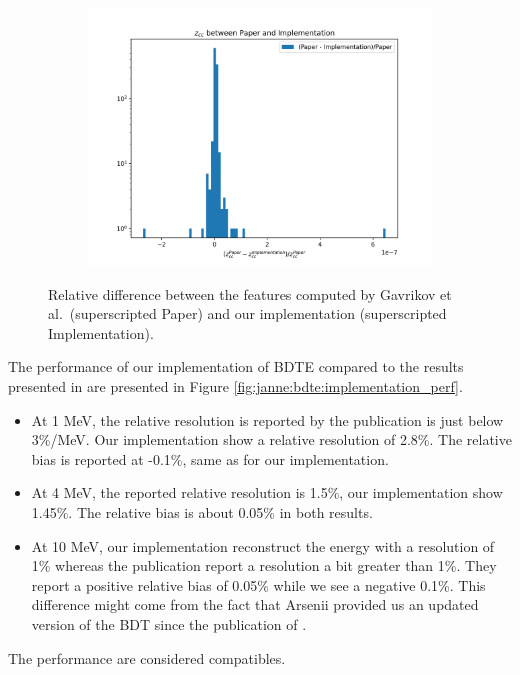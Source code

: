 \documentclass[../main.tex]{subfiles}
\begin{document}
\begin{figure}[ht]
\begin{subfigure}[t]{0.32\linewidth}
    \includegraphics[width=\linewidth]{images/janne/bdte/z_cc_diff.png}
  \end{subfigure}
  \caption{Relative difference between the features computed by Gavrikov et al.\ (superscripted Paper) and our implementation (superscripted Implementation).}
  \label{fig:janne:feat_diff}
\end{figure}

The performance of our implementation of BDTE compared to the results presented in \cite{gavrikov_energy_2022} are presented in Figure \ref{fig:janne:bdte:implementation_perf}.
\begin{itemize}
  \item At 1 MeV, the relative resolution is reported by the publication is just below 3\%/MeV. Our implementation show a relative resolution of 2.8\%. The relative bias is reported at -0.1\%, same as for our implementation.
  \item At 4 MeV, the reported relative resolution is 1.5\%, our implementation show 1.45\%. The relative bias is about 0.05\% in both results.
  \item At 10 MeV, our implementation reconstruct the energy with a resolution of 1\% whereas the publication report a resolution a bit greater than 1\%. They report a positive relative bias of 0.05\% while we see a negative 0.1\%. This difference might come from the fact that Arsenii provided us an updated version of the BDT since the publication of \cite{gavrikov_energy_2022}.
\end{itemize}
The performance are considered compatibles.
\end{document}
